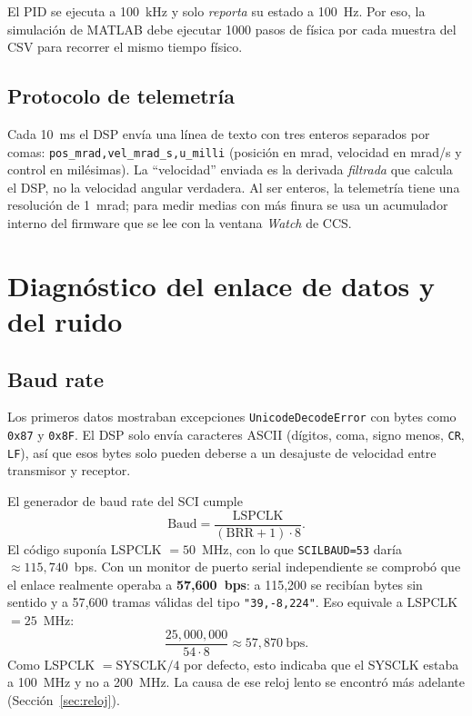 \documentclass[11pt,a4paper]{article}
\begin{document}
El PID se ejecuta a 100~kHz y solo \emph{reporta} su estado a 100~Hz. Por eso, la simulación de MATLAB debe ejecutar 1000 pasos de física por cada muestra del CSV para recorrer el mismo tiempo físico.

\subsection{Protocolo de telemetría}

Cada 10~ms el DSP envía una línea de texto con tres enteros separados por comas: \texttt{pos\_mrad,vel\_mrad\_s,u\_milli} (posición en mrad, velocidad en mrad/s y control en milésimas). La ``velocidad'' enviada es la derivada \emph{filtrada} que calcula el DSP, no la velocidad angular verdadera. Al ser enteros, la telemetría tiene una resolución de 1~mrad; para medir medias con más finura se usa un acumulador interno del firmware que se lee con la ventana \emph{Watch} de CCS.

\section{Diagnóstico del enlace de datos y del ruido}
\label{sec:enlace}

\subsection{Baud rate}

Los primeros datos mostraban excepciones \texttt{UnicodeDecodeError} con bytes como \texttt{0x87} y \texttt{0x8F}. El DSP solo envía caracteres ASCII (dígitos, coma, signo menos, \texttt{CR}, \texttt{LF}), así que esos bytes solo pueden deberse a un desajuste de velocidad entre transmisor y receptor.

El generador de baud rate del SCI cumple
\begin{equation}
\text{Baud} = \frac{\text{LSPCLK}}{(\text{BRR}+1)\cdot 8}.
\end{equation}
El código suponía LSPCLK $=50$~MHz, con lo que \texttt{SCILBAUD=53} daría $\approx 115{,}740$~bps. Con un monitor de puerto serial independiente se comprobó que el enlace realmente operaba a \textbf{57{,}600~bps}: a 115{,}200 se recibían bytes sin sentido y a 57{,}600 tramas válidas del tipo \texttt{"39,-8,224"}. Eso equivale a LSPCLK $=25$~MHz:
\begin{equation}
\frac{25{,}000{,}000}{54\cdot 8}\approx 57{,}870\ \text{bps}.
\end{equation}
Como LSPCLK $=\text{SYSCLK}/4$ por defecto, esto indicaba que el SYSCLK estaba a 100~MHz y no a 200~MHz. La causa de ese reloj lento se encontró más adelante (Sección~\ref{sec:reloj}).
\end{document}

